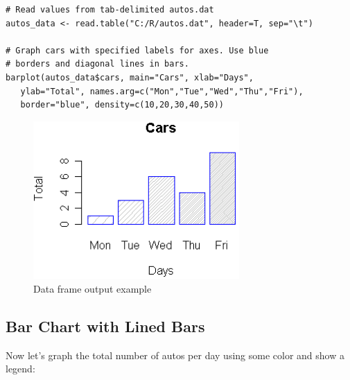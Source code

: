 \documentclass[10pt]{book}
\begin{document}
\begin{lstlisting}
# Read values from tab-delimited autos.dat 
autos_data <- read.table("C:/R/autos.dat", header=T, sep="\t")
   
# Graph cars with specified labels for axes. Use blue 
# borders and diagonal lines in bars.
barplot(autos_data$cars, main="Cars", xlab="Days",  
   ylab="Total", names.arg=c("Mon","Tue","Wed","Thu","Fri"), 
   border="blue", density=c(10,20,30,40,50))
\end{lstlisting}
\begin{figure}[H]
    \begin{flushleft}
        \includegraphics[width=0.7\textwidth]{bar_script2.png}
        \caption{Data frame output example}
        \label{fig:dataframe}
    \end{flushleft}
\end{figure}

\subsection*{Bar Chart with Lined Bars}
Now let's graph the total number of autos per day using some color and show a legend:
\end{document}

